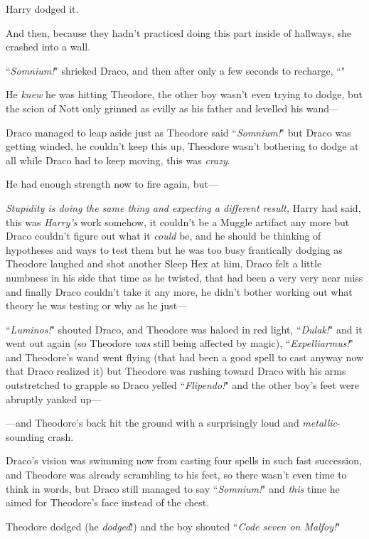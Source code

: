 Harry dodged it.

And then, because they hadn't practiced doing this part inside of hallways, she crashed into a wall.

\later

``\emph{Somnium!}" shrieked Draco, and then after only a few seconds to recharge, ``"

He \emph{knew} he was hitting Theodore, the other boy wasn't even trying to dodge, but the scion of Nott only grinned as evilly as his father and levelled his wand—

Draco managed to leap aside just as Theodore said ``\emph{Somnium!}" but Draco was getting winded, he couldn't keep this up, Theodore wasn't bothering to dodge at all while Draco had to keep moving, this was \emph{crazy}.

He had enough strength now to fire again, but—

\emph{Stupidity is doing the same thing and expecting a different result,} Harry had said, this was \emph{Harry's} work somehow, it couldn't be a Muggle artifact any more but Draco couldn't figure out what it \emph{could} be, and he should be thinking of hypotheses and ways to test them but he was too busy frantically dodging as Theodore laughed and shot another Sleep Hex at him, Draco felt a little numbness in his side that time as he twisted, that had been a very very near miss and finally Draco couldn't take it any more, he didn't bother working out what theory he was testing or why as he just—

``\emph{Luminos!}" shouted Draco, and Theodore was haloed in red light, ``\emph{Dulak!}" and it went out again (so Theodore \emph{was} still being affected by magic), ``\emph{Expelliarmus!}" and Theodore's wand went flying (that had been a good spell to cast anyway now that Draco realized it) but Theodore was rushing toward Draco with his arms outstretched to grapple so Draco yelled ``\emph{Flipendo!}" and the other boy's feet were abruptly yanked up—

—and Theodore's back hit the ground with a surprisingly loud and \emph{metallic}-sounding crash.

Draco's vision was swimming now from casting four spells in such fast succession, and Theodore was already scrambling to his feet, so there wasn't even time to think in words, but Draco still managed to say ``\emph{Somnium!}" and \emph{this} time he aimed for Theodore's face instead of the chest.

Theodore dodged (he \emph{dodged}!) and the boy shouted ``\emph{Code seven on Malfoy!}"

